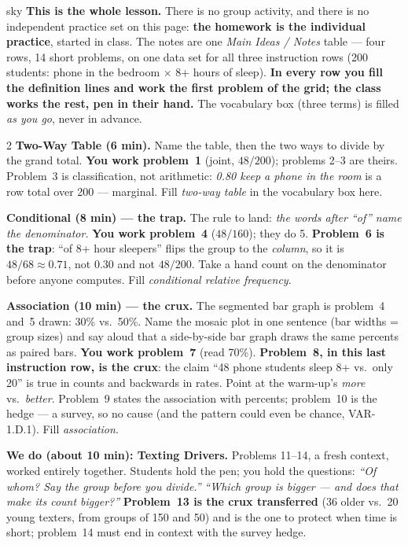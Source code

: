 \documentclass[10pt]{article}
\begin{document}
\boxguard
\begin{skillbox}{sky}
\textbf{This is the whole lesson.} There is no group activity, and there is no independent
practice set on this page: \textbf{the homework is the individual practice}, started in class.
The notes are one \emph{Main Ideas / Notes} table --- four rows, 14 short problems, on one data
set for all three instruction rows (200 students: phone in the bedroom $\times$ 8+ hours of
sleep). \textbf{In every row you fill the definition lines and work the first problem of the
grid; the class works the rest, pen in their hand.} The vocabulary box (three terms) is filled
\emph{as you go}, never in advance.
\begin{multicols}{2}
\textbf{Two-Way Table (6 min).} Name the table, then the two ways to divide by the grand
total. \textbf{You work problem~1} (joint, $48/200$); problems 2--3 are theirs. Problem~3 is
classification, not arithmetic: \emph{0.80 keep a phone in the room} is a row total over 200 ---
marginal. Fill \emph{two-way table} in the vocabulary box here.

\textbf{Conditional (8 min) --- the trap.} The rule to land: \emph{the words after ``of'' name
the denominator.} \textbf{You work problem~4} ($48/160$); they do 5. \textbf{Problem~6 is the
trap}: ``of 8+ hour sleepers'' flips the group to the \emph{column}, so it is $48/68 \approx 0.71$,
not $0.30$ and not $48/200$. Take a hand count on the denominator before anyone computes. Fill
\emph{conditional relative frequency}.

\textbf{Association (10 min) --- the crux.} The segmented bar graph is problem~4 and~5 drawn:
30\% vs.\ 50\%. Name the mosaic plot in one sentence (bar widths = group sizes) and say aloud
that a side-by-side bar graph draws the same percents as paired bars. \textbf{You work
problem~7} (read 70\%). \textbf{Problem~8, in this last instruction row, is the crux}: the claim
``48 phone students sleep 8+ vs.\ only 20'' is true in counts and backwards in rates. Point at
the warm-up's \emph{more} vs.\ \emph{better}. Problem~9 states the association with percents;
problem~10 is the hedge --- a survey, so no cause (and the pattern could even be chance,
VAR-1.D.1). Fill \emph{association}.

\columnbreak
\textbf{We do (about 10 min): Texting Drivers.} Problems 11--14, a fresh context, worked
entirely together. Students hold the pen; you hold the questions: \emph{``Of whom? Say the group
before you divide.''} \quad \emph{``Which group is bigger --- and does that make its count
bigger?''} \textbf{Problem~13 is the crux transferred} (36 older vs.\ 20 young texters, from
groups of 150 and 50) and is the one to protect when time is short; problem~14 must end in
context with the survey hedge.


\end{multicols}
\end{skillbox}
\end{document}
